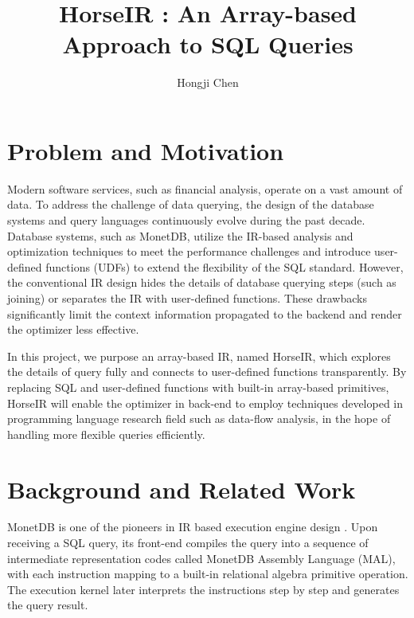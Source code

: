 \documentclass[sigplan]{acmart}
\begin{document}
\title{HorseIR : An Array-based Approach to SQL Queries}

\author{Hongji Chen}

\maketitle

\section{Problem and Motivation}

Modern software services, such as financial analysis, operate on a vast amount
of data. To address the challenge of data querying, the design of the database
systems and query languages continuously evolve during the past decade.
Database systems, such as MonetDB\cite{MonetDBHome}, utilize the
IR-based analysis and optimization techniques to meet the performance
challenges and introduce user-defined functions (UDFs) to extend the
flexibility of the SQL standard.  However, the conventional IR design hides the
details of database querying steps (such as joining) or separates the IR with
user-defined functions. These drawbacks significantly limit the context
information propagated to the backend and render the optimizer less effective. 

In this project, we purpose an array-based IR, named HorseIR, which explores the
details of query fully and connects to user-defined functions transparently. By
replacing SQL and user-defined functions with built-in array-based primitives,
HorseIR will enable the optimizer in back-end to employ techniques developed in
programming language research field such as data-flow analysis, in the hope of
handling more flexible queries efficiently. 

\section{Background and Related Work}

MonetDB is one of the pioneers in IR based execution engine design
\cite{DBLP:journals/debu/IdreosGNMMK12}. Upon receiving a SQL query, its
front-end compiles the query into a sequence of intermediate representation
codes called MonetDB Assembly Language (MAL), with each instruction mapping to
a built-in relational algebra primitive operation. The execution kernel later
interprets the instructions step by step and generates the query result.
\end{document}

